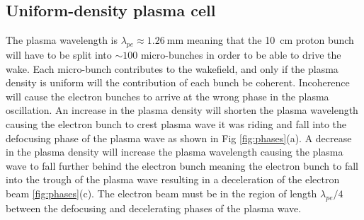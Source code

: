 \subsection{Uniform-density plasma cell}

The plasma wavelength is \(\lambda_{pe} \approx \SI{1.26}{\milli\meter}\)
meaning that the \SI{10}{\centi\meter} proton bunch will have to be split into
\(\sim 100\) micro-bunches in order to be able to drive the wake.  Each
micro-bunch contributes to the wakefield, and only if the plasma density is
uniform will the contribution of each bunch be coherent. Incoherence will cause
the electron bunches to arrive at the wrong phase in the plasma oscillation. An
increase in the plasma density will shorten the plasma wavelength causing the
electron bunch to crest plasma wave it was riding and fall into the defocusing
phase of the plasma wave as shown in Fig \ref{fig:phases}(a). A decrease
in the plasma density will increase the plasma wavelength causing the plasma
wave to fall further behind the electron bunch meaning the electron bunch to
fall into the trough of the plasma wave resulting in a deceleration of the
electron beam \ref{fig:phases}(c). The electron beam must be in the
region of length \(\lambda_{pe}/4\) between the defocusing and decelerating
phases of the plasma wave.

